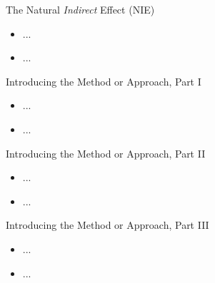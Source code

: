 \documentclass[12pt,t,handout]{beamer}
\begin{document}
\begin{frame}[c]{The Natural \textit{Indirect} Effect (NIE)}

\begin{center}
\begin{itemize}
  \item ...
  \item ...
\end{itemize}
\end{center}


\end{frame}


\begin{frame}[c]{Introducing the Method or Approach, Part I}

\begin{center}
\begin{itemize}
  \item ...
  \item ...
\end{itemize}
\end{center}


\end{frame}


\begin{frame}[c]{Introducing the Method or Approach, Part II}

\begin{center}
\begin{itemize}
  \item ...
  \item ...
\end{itemize}
\end{center}


\end{frame}


\begin{frame}[c]{Introducing the Method or Approach, Part III}

\begin{center}
\begin{itemize}
  \item ...
  \item ...
\end{itemize}
\end{center}


\end{frame}
\end{document}
